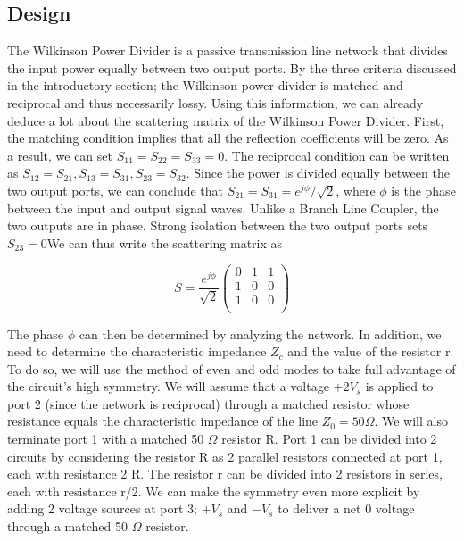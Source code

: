 \documentclass[twocolumn, aps, apl]{revtex4-1}
\begin{document}
\subsection{Design}
The Wilkinson Power Divider is a passive transmission line network that divides the input power equally between two output ports. By the three criteria discussed in the introductory section; the Wilkinson power divider is matched and reciprocal and thus necessarily lossy. Using this information, we can already deduce a lot about the scattering matrix of the Wilkinson Power Divider. First, the matching condition implies that all the reflection coefficients will be zero. As a result, we can set $S_{11} = S_{22} = S_{33} = 0$. The reciprocal condition can be written as $S_{12} = S_{21}, S_{13} = S_{31}, S_{23} = S_{32}$. Since the power is divided equally between the two output ports, we can conclude that $S_{21} = S_{31} = e^{j \phi}/\sqrt{2} $, where $\phi$ is the phase between the input and output signal waves. Unlike a Branch Line Coupler, the two outputs are in phase. Strong isolation between the two output ports sets $S_{23} = 0$We can thus write the scattering matrix as 

\begin{equation}
S = \frac{e^{j \phi}}{\sqrt{2}}
\begin{pmatrix}
    0 & 1 & 1 \\
    1 & 0 & 0 \\
    1 & 0 & 0 \\
\end{pmatrix}
\end{equation}

The phase $\phi$ can then be determined by analyzing the network. In addition, we need to determine the characteristic impedance $Z_c$ and the value of the resistor r. To do so, we will use the method of even and odd modes to take full advantage of the circuit's high symmetry. We will assume that a voltage $+2 V_s$ is applied to port 2 (since the network is reciprocal) through a matched resistor whose resistance equals the characteristic impedance of the line $Z_0 = 50 \Omega$. We will also terminate port 1 with a matched 50 $\Omega$ resistor R. Port 1 can be divided into 2 circuits by considering the resistor R as 2 parallel resistors connected at port 1, each with resistance 2 R. The resistor r can be divided into 2 resistors in series, each with resistance r/2. We can make the symmetry even more explicit by adding 2 voltage sources at port 3; $+V_s$ and $-V_s$ to deliver a net 0 voltage through a matched 50 $\Omega$ resistor. 
\end{document}
